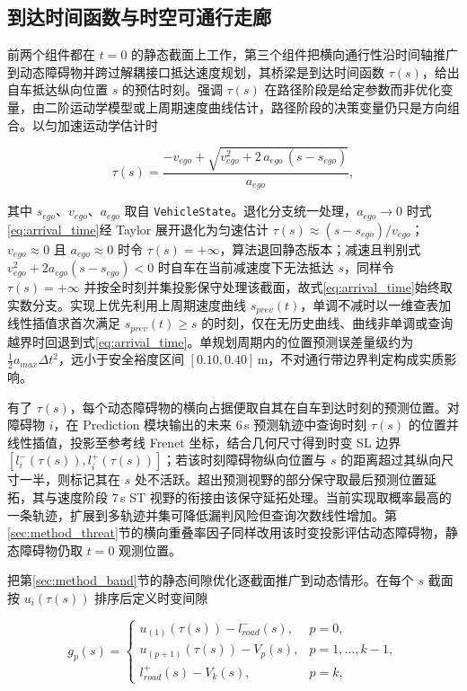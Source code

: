 \documentclass[a4paper,zihao=5]{ctexart}
\theoremstyle{definition}
\begin{document}
\subsection{到达时间函数与时空可通行走廊}
\label{sec:method_corridor}

前两个组件都在 $t=0$ 的静态截面上工作，第三个组件把横向通行性沿时间轴推广到动态障碍物并跨过解耦接口抵达速度规划，其桥梁是到达时间函数 $\tau(s)$，给出自车抵达纵向位置 $s$ 的预估时刻。强调 $\tau(s)$ 在路径阶段是给定参数而非优化变量，由二阶运动学模型或上周期速度曲线估计，路径阶段的决策变量仍只是方向组合。以匀加速运动学估计时

\begin{equation}
    \tau(s) = \frac{-v_{ego} + \sqrt{v_{ego}^{2} + 2\,a_{ego}\,(s - s_{ego})}}{a_{ego}},
    \label{eq:arrival_time}
\end{equation}

其中 $s_{ego}$、$v_{ego}$、$a_{ego}$ 取自 \texttt{VehicleState}。退化分支统一处理，$a_{ego}\to 0$ 时式\eqref{eq:arrival_time}经 Taylor 展开退化为匀速估计 $\tau(s)\approx (s-s_{ego})/v_{ego}$；$v_{ego}\approx 0$ 且 $a_{ego}\approx 0$ 时令 $\tau(s)=+\infty$，算法退回静态版本；减速且判别式 $v_{ego}^{2}+2a_{ego}(s-s_{ego})<0$ 时自车在当前减速度下无法抵达 $s$，同样令 $\tau(s)=+\infty$ 并按全时刻并集投影保守处理该截面，故式\eqref{eq:arrival_time}始终取实数分支。实现上优先利用上周期速度曲线 $s_{prev}(t)$，单调不减时以一维查表加线性插值求首次满足 $s_{prev}(t)\geq s$ 的时刻，仅在无历史曲线、曲线非单调或查询越界时回退到式\eqref{eq:arrival_time}。单规划周期内的位置预测误差量级约为 $\tfrac{1}{2}a_{max}\Delta t^{2}$，远小于安全裕度区间 $[0.10, 0.40]$\,m，不对通行带边界判定构成实质影响。

有了 $\tau(s)$，每个动态障碍物的横向占据便取自其在自车到达时刻的预测位置。对障碍物 $i$，在 Prediction 模块输出的未来 $6$\,s 预测轨迹中查询时刻 $\tau(s)$ 的位置并线性插值，投影至参考线 Frenet 坐标，结合几何尺寸得到时变 SL 边界 $[l_i^{-}(\tau(s)), l_i^{+}(\tau(s))]$；若该时刻障碍物纵向位置与 $s$ 的距离超过其纵向尺寸一半，则标记其在 $s$ 处不活跃。超出预测视野的部分保守取最后预测位置延拓，其与速度阶段 $7$\,s ST 视野的衔接由该保守延拓处理。当前实现取概率最高的一条轨迹，扩展到多轨迹并集可降低漏判风险但查询次数线性增加。第\ref{sec:method_threat}节的横向重叠率因子同样改用该时变投影评估动态障碍物，静态障碍物仍取 $t=0$ 观测位置。

把第\ref{sec:method_band}节的静态间隙优化逐截面推广到动态情形。在每个 $s$ 截面按 $u_i(\tau(s))$ 排序后定义时变间隙

\begin{equation}
    g_p(s) =
    \begin{cases}
        u_{(1)}(\tau(s)) - l_{road}^{-}(s), & p=0, \\[0.3em]
        u_{(p+1)}(\tau(s)) - V_p(s), & p=1,\ldots,k-1, \\[0.3em]
        l_{road}^{+}(s) - V_k(s), & p=k,
    \end{cases}
    \label{eq:time_varying_gap}
\end{equation}
\end{document}
